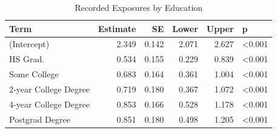 \begin{table}

\caption{\label{tab:educ_breaches}Recorded Exposures by Education}
\centering
\begin{tabular}[t]{lrrrrl}
\toprule
Term & Estimate & SE & Lower & Upper & p\\
\midrule
(Intercept) & 2.349 & 0.142 & 2.071 & 2.627 & <0.001\\
HS Grad. & 0.534 & 0.155 & 0.229 & 0.839 & <0.001\\
Some College & 0.683 & 0.164 & 0.361 & 1.004 & <0.001\\
2-year College Degree & 0.719 & 0.180 & 0.367 & 1.072 & <0.001\\
4-year College Degree & 0.853 & 0.166 & 0.528 & 1.178 & <0.001\\
\addlinespace
Postgrad Degree & 0.851 & 0.180 & 0.498 & 1.205 & <0.001\\
\bottomrule
\end{tabular}
\end{table}
